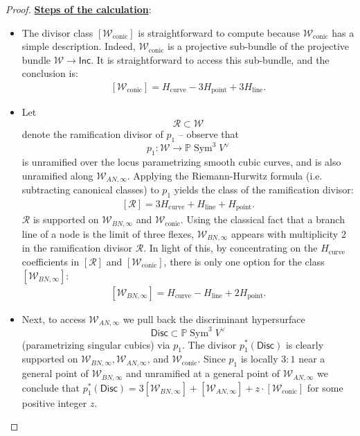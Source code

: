 \documentclass[12 pt, reqno]{amsart}
\theoremstyle{definition}
\newcommand{\on}{\operatorname}
\newcommand{\mb}{\mathbb}
\renewcommand{\P}{\mb{P}}
\begin{document}
\begin{proof}
  \underline{{\bf Steps of the calculation}}:
  \begin{itemize}
  \item [{\bf Step 1}:] The divisor class $[\mathcal{W}_{\on{conic}}]$
    is straightforward to compute because $\mathcal{W}_{\on{conic}}$
    has a simple description. Indeed, $\mathcal{W}_{\on{conic}}$ is a
    projective sub-bundle of the projective bundle
    $\mathcal{W} \to \mathsf{Inc}$.  It is straightforward to access
    this sub-bundle, and the conclusion is:
    \begin{align}
      \label{eq:conic}
      [\mathcal{W}_{\on{conic}}] = H_{\on{curve}} - 3H_{\on{point}} + 3H_{\on{line}}.
    \end{align}
  \item [{\bf Step 2}:] 
   Let
  \[\mathcal{R} \subset \mathcal{W}\] denote the ramification divisor
  of $p_{1}$ -- observe that
  \[p_{1}: \mathcal{W} \to \P \on{Sym}^{3}V^{\vee}\] is unramified
  over the locus parametrizing smooth cubic curves, and is also
  unramified along $\mathcal{W}_{AN,\infty}$. Applying the
  Riemann-Hurwitz formula (i.e. subtracting canonical classes) to
  $p_{1}$ yields the class of the ramification divisor:
  \begin{align}
    \label{eq:R}
    [\mathcal{R}] = 3H_{\on{curve}} + H_{\on{line}} + H_{\on{point}}.
  \end{align}
  $\mathcal{R}$ is supported on $\mathcal{W}_{BN, \infty}$ and
  $\mathcal{W}_{\on{conic}}$. Using the classical fact that a branch
  line of a node is the limit of three flexes,
  $\mathcal{W}_{BN, \infty}$ appears with multiplicity 2 in the
  ramification divisor $\mathcal{R}$. In light of this, by
  concentrating on the $H_{\on{curve}}$ coefficients in
  $[\mathcal{R}]$ and $[\mathcal{W}_{\on{conic}}]$, there is only one
  option for the class $[\mathcal{W}_{BN,\infty}]$:
    \begin{align}
      \label{eq:WBN}
      [\mathcal{W}_{BN,\infty}] = H_{\on{curve}} - H_{\on{line}} + 2H_{\on{point}}.
    \end{align}
  \item [{\bf Step 3}:] Next, to access $\mathcal{W}_{AN,\infty}$ we
    pull back the discriminant hypersurface
    \[\mathsf{Disc} \subset \P \on{Sym}^{3}V^{\vee}\] (parametrizing singular cubics) via
    $p_{1}$. The divisor $p_{1}^{*}(\mathsf{Disc})$ is clearly
    supported on $\mathcal{W}_{BN, \infty}, \mathcal{W}_{AN, \infty}$,
    and $\mathcal{W}_{\on{conic}}$. Since $p_{1}$ is locally $3:1$
    near a general point of $\mathcal{W}_{BN, \infty}$ and unramified
    at a general point of $\mathcal{W}_{AN,\infty}$ we conclude that
    $p_{1}^{*}(\mathsf{Disc}) = 3 [\mathcal{W}_{BN, \infty}] +
    [\mathcal{W}_{AN,\infty}] + z \cdot [\mathcal{W}_{\on{conic}}]$
    for some positive integer $z$.


\end{itemize}
\end{proof}
\end{document}
